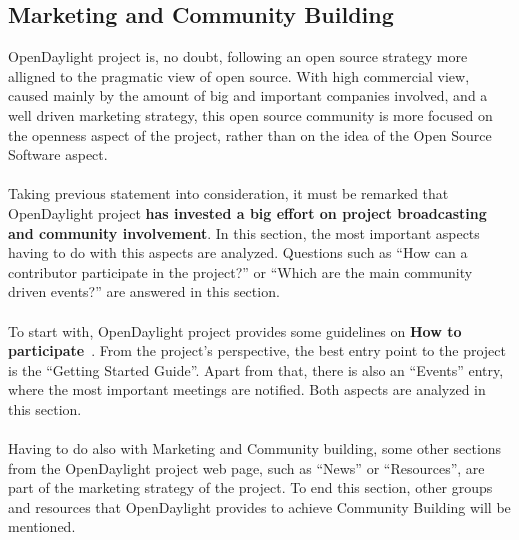 \documentclass[a4paper, 12pt]{book}
\begin{document}
\subsection{Marketing and Community Building}
OpenDaylight project is, no doubt, following an open source strategy more alligned to the pragmatic view of open source. With high commercial view, caused mainly by the amount of big and important companies involved, and a well driven marketing strategy, this open source community is more focused on the openness aspect of the project, rather than on the idea of the Open Source Software aspect.\\
\\
Taking previous statement into consideration, it must be remarked that OpenDaylight project \textbf{has invested a big effort on project broadcasting and community involvement}. In this section, the most important aspects having to do with this aspects are analyzed. Questions such as ``How can a contributor participate in the project?'' or ``Which are the main community driven events?'' are answered in this section.\\
\\
To start with, OpenDaylight project provides some guidelines on \textbf{How to participate}~\cite{OpenDaylightHowToParticipate}. From the project's perspective, the best entry point to the project is the ``Getting Started Guide''. Apart from that, there is also an ``Events'' entry, where the most important meetings are notified. Both aspects are analyzed in this section.\\
\\
Having to do also with Marketing and Community building, some other sections from the OpenDaylight project web page, such as ``News'' or ``Resources'', are part of the marketing strategy of the project. To end this section, other groups and resources that OpenDaylight provides to achieve Community Building will be mentioned.
\end{document}
